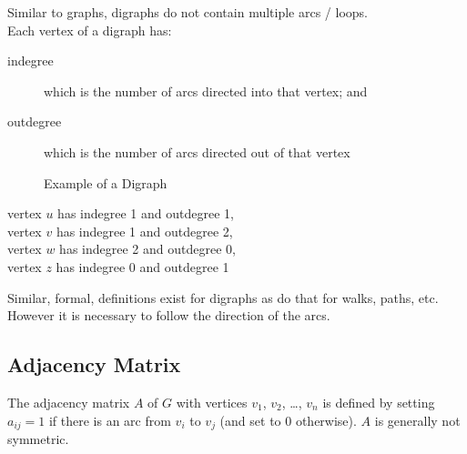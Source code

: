Similar to graphs, digraphs do not contain multiple arcs / loops.\\

Each vertex of a digraph has:
\begin{description}
    \item[indegree] which is the number of arcs directed into that vertex; and
    \item[outdegree] which is the number of arcs directed out of that vertex
\end{description}

\begin{minipage}{0.5\textwidth}
    \begin{figure}[H]
        \centering
        \caption{Example of a Digraph}
    \end{figure}
\end{minipage} \hfill
\begin{minipage}{0.45\textwidth}
vertex $u$ has indegree 1 and outdegree 1,\\
vertex $v$ has indegree 1 and outdegree 2,\\
vertex $w$ has indegree 2 and outdegree 0,\\
vertex $z$ has indegree 0 and outdegree 1
\end{minipage}\vspace{0.5em}

Similar, formal, definitions exist for digraphs as do that for walks, paths, etc. However it is necessary to follow the direction of the arcs.

\subsection{Adjacency Matrix}
The adjacency matrix $A$ of $G$ with vertices $v_1$, $v_2$, \ldots, $v_n$ is defined by setting $a_{ij} = 1$ if there is an arc from $v_i$ to $v_j$ (and set to 0 otherwise). $A$ is generally not symmetric.

